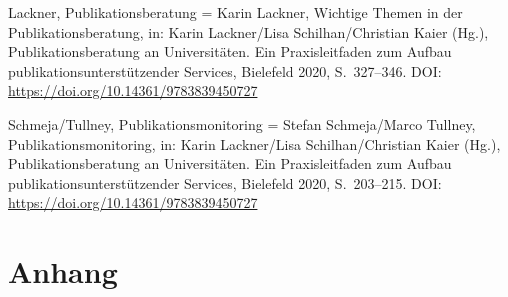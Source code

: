 \documentclass[a4paper,
fontsize=11pt,
oneside,
numbers=noperiodatend,
parskip=half-,
bibliography=totoc,
final
]{scrartcl}
\begin{document}
Lackner, Publikationsberatung = Karin Lackner, Wichtige Themen in der
Publikationsberatung, in: Karin Lackner/Lisa Schilhan/Christian Kaier
(Hg.), Publikationsberatung an Universitäten. Ein Praxisleitfaden zum
Aufbau publikationsunterstützender Services, Bielefeld 2020,
S.~327--346. DOI: \url{https://doi.org/10.14361/9783839450727}

Schmeja/Tullney, Publikationsmonitoring = Stefan Schmeja/Marco Tullney,
Publikationsmonitoring, in: Karin Lackner/Lisa Schilhan/Christian Kaier
(Hg.), Publikationsberatung an Universitäten. Ein Praxisleitfaden zum
Aufbau publikationsunterstützender Services, Bielefeld 2020,
S.~203--215. DOI: \url{https://doi.org/10.14361/9783839450727}

\hypertarget{anhang}{%
\section{Anhang}\label{anhang}}
\end{document}
